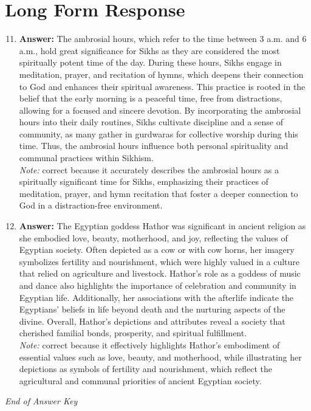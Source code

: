 \documentclass[12pt]{article}
\begin{document}
\section*{Long Form Response}
\begin{enumerate}[label=\arabic*.]
\setcounter{enumi}{10}
\item \textbf{Answer:} The ambrosial hours, which refer to the time between 3 a.m. and 6 a.m., hold great significance for Sikhs as they are considered the most spiritually potent time of the day. During these hours, Sikhs engage in meditation, prayer, and recitation of hymns, which deepens their connection to God and enhances their spiritual awareness. This practice is rooted in the belief that the early morning is a peaceful time, free from distractions, allowing for a focused and sincere devotion. By incorporating the ambrosial hours into their daily routines, Sikhs cultivate discipline and a sense of community, as many gather in gurdwaras for collective worship during this time. Thus, the ambrosial hours influence both personal spirituality and communal practices within Sikhism.
\\ \textit{Note:} correct because it accurately describes the ambrosial hours as a spiritually significant time for Sikhs, emphasizing their practices of meditation, prayer, and hymn recitation that foster a deeper connection to God in a distraction-free environment.
\item \textbf{Answer:} The Egyptian goddess Hathor was significant in ancient religion as she embodied love, beauty, motherhood, and joy, reflecting the values of Egyptian society. Often depicted as a cow or with cow horns, her imagery symbolizes fertility and nourishment, which were highly valued in a culture that relied on agriculture and livestock. Hathor's role as a goddess of music and dance also highlights the importance of celebration and community in Egyptian life. Additionally, her associations with the afterlife indicate the Egyptians' beliefs in life beyond death and the nurturing aspects of the divine. Overall, Hathor's depictions and attributes reveal a society that cherished familial bonds, prosperity, and spiritual fulfillment.
\\ \textit{Note:} correct because it effectively highlights Hathor's embodiment of essential values such as love, beauty, and motherhood, while illustrating her depictions as symbols of fertility and nourishment, which reflect the agricultural and communal priorities of ancient Egyptian society.
\end{enumerate}

\vfill
\noindent\textit{End of Answer Key}
\end{document}
